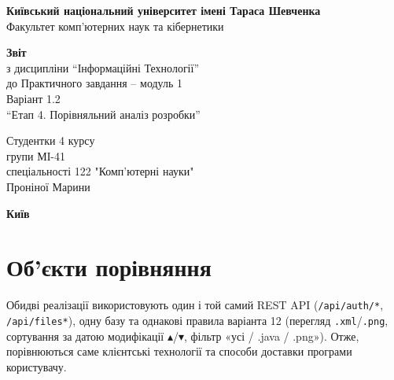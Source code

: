 \documentclass[12pt,a4paper]{article}
\begin{document}
\begin{titlepage}
\centering\large
\textbf{Київський національний університет імені Тараса Шевченка}\\
Факультет комп'ютерних наук та кібернетики

\textbf{Звіт}\\
з дисципліни “Інформаційні Технології”\\
до Практичного завдання -- модуль 1\\
Варіант 1.2\\
“Етап 4. Порівняльний аналіз розробки”

\begin{flushright}
Студентки 4 курсу\\
групи МІ-41\\
спеціальності 122 "Комп’ютерні науки"\\
Проніної Марини
\end{flushright}

\textbf{Київ \the\year}
\end{titlepage}

\begin{abstract}
\noindent
У звіті порівнюються дві реалізації клієнта системи «Хмарне сховище» (тип 2, варіант 12): \textbf{десктоп-клієнт} на Python/PySide6 (етап 2) та \textbf{веб-клієнт} на Vue 3 (етап 3), що працюють з одним сервером FastAPI. Виділено спільні елементи й відмінності; порівняння охоплює архітектуру, функціональність, зручність, розгортання, продуктивність, тестованість і безпеку; наведено зведену таблицю, переваги й недоліки та обґрунтовано вибір найкращої технології.
\end{abstract}

\tableofcontents
\newpage


\section{Об'єкти порівняння}

Обидві реалізації використовують один і той самий REST API (\texttt{/\allowbreak{}api/\allowbreak{}auth/\allowbreak{}*}, \texttt{/\allowbreak{}api/\allowbreak{}files*}), одну базу та однакові правила варіанта 12 (перегляд \texttt{.xml}/\texttt{.png}, сортування за датою модифікації $\blacktriangle$/$\blacktriangledown$, фільтр «усі / .java / .png»). Отже, порівнюються саме клієнтські технології та способи доставки програми користувачу.
\end{document}

